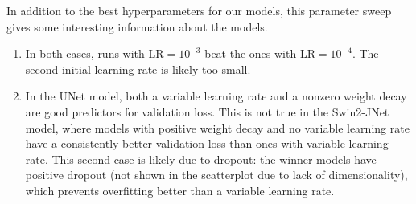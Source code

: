 In addition to the best hyperparameters for our models, this parameter sweep gives some interesting information about the models.
\begin{enumerate}
	\item In both cases, runs with $\text{LR} = 10^{-3}$ beat the ones with $\text{LR} = 10^{-4}$. The second initial learning rate is likely too small.
	\item In the UNet model, both a variable learning rate and a nonzero \lt{} weight decay are good predictors for validation loss.
		This is not true in the Swin2-JNet model, where models with positive weight decay and no variable learning rate have a consistently better validation loss than ones with variable learning rate.
		This second case is likely due to dropout: the winner models have positive dropout (not shown in the scatterplot due to lack of dimensionality), which prevents overfitting better than a variable learning rate.
\end{enumerate}
